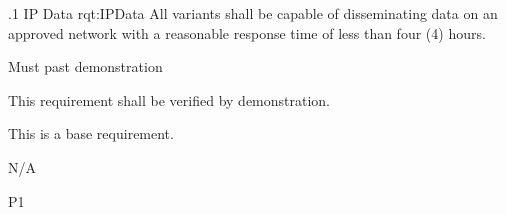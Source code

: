 \ONERQMTVKPP
{\RqtNumberBase.1}
{IP Data}
{rqt:IPData}
{All \ThisSystem variants shall be capable of disseminating data on an approved network with a reasonable response time of less than four (4) hours.}
{
	\item [Phase 1] Must past demonstration
}
{This requirement shall be verified by demonstration.}
{
\item [N/A] This is a base requirement.
}
{
	\item N/A
}
{P1}


